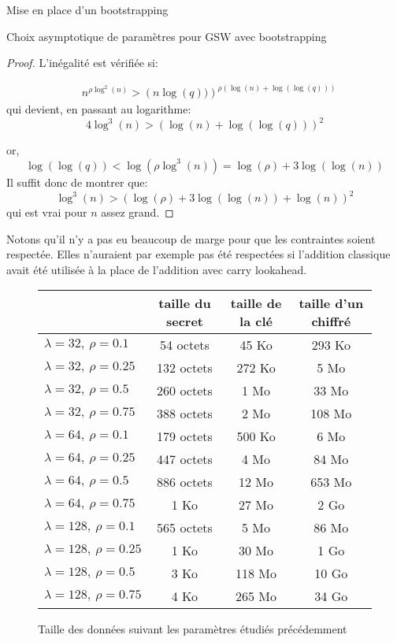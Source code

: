 \begin{section}{Mise en place d'un bootstrapping}
\begin{subsection}{Choix asymptotique de paramètres pour GSW avec bootstrapping}
\begin{proof}
L'inégalité est vérifiée si:

	\begin{align*} &n^{\rho \log^2(n)} > {\left(n\log(q))\right)}^{\rho \left(\log(n) +
	\log(\log(q))\right)}\end{align*}
qui devient, en passant au logarithme:
\[ 4 \log^3(n) > {(\log(n) + \log(\log(q)))}^2 \]

or,
\[ \log(\log(q)) < \log(\rho \log^3(n)) = \log(\rho) + 3 \log(\log(n)) \]
Il suffit donc de montrer que:
\[ \log^3(n) > {(\log(\rho) + 3\log(\log(n)) + \log(n))}^2 \]
qui est vrai pour $n$ assez grand.
\end{proof}
\begin{rmq}
Notons qu'il n'y a pas eu beaucoup de marge pour que les contraintes soient
respectée. Elles n'auraient par exemple pas été respectées si l'addition 
classique avait été utilisée à la place de l'addition avec carry lookahead.
\end{rmq}

\begin{figure}
\begin{tabular}{|l|c|c|c|}
\hline
& taille du secret & taille de la clé & taille d'un chiffré \\
\hline
$\lambda = 32, \ \rho = 0.1$ & 54 octets & 45 Ko & 293 Ko \\
\hline
$\lambda = 32, \ \rho = 0.25$ & 132 octets & 272 Ko & 5 Mo \\
\hline
$\lambda = 32, \ \rho = 0.5$ & 260 octets & 1 Mo & 33 Mo \\
\hline
$\lambda = 32, \ \rho = 0.75$ & 388 octets & 2 Mo & 108 Mo \\
\hline
$\lambda = 64, \ \rho = 0.1$ & 179 octets & 500 Ko & 6 Mo \\
\hline
$\lambda = 64, \ \rho = 0.25$ & 447 octets & 4 Mo & 84 Mo \\
\hline
$\lambda = 64, \ \rho = 0.5$ & 886 octets & 12 Mo & 653 Mo \\
\hline
$\lambda = 64, \ \rho = 0.75$ & 1 Ko & 27 Mo & 2 Go \\
\hline
$\lambda = 128, \ \rho = 0.1$ & 565 octets & 5 Mo & 86 Mo \\
\hline
$\lambda = 128, \ \rho = 0.25$ & 1 Ko & 30 Mo & 1 Go \\
\hline
$\lambda = 128, \ \rho = 0.5$ & 3 Ko & 118 Mo & 10 Go \\
\hline
$\lambda = 128, \ \rho = 0.75$ & 4 Ko & 265 Mo & 34 Go \\
\hline
\end{tabular}
\caption{Taille des données suivant les paramètres étudiés précédemment}
\end{figure}

\end{subsection}
\end{section}

